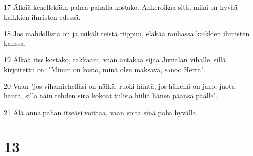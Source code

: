 \par 17 Älkää kenellekään pahaa pahalla kostako. Ahkeroikaa sitä, mikä on hyvää kaikkien ihmisten edessä.
\par 18 Jos mahdollista on ja mikäli teistä riippuu, eläkää rauhassa kaikkien ihmisten kanssa.
\par 19 Älkää itse kostako, rakkaani, vaan antakaa sijaa Jumalan vihalle, sillä kirjoitettu on: "Minun on kosto, minä olen maksava, sanoo Herra".
\par 20 Vaan "jos vihamiehelläsi on nälkä, ruoki häntä, jos hänellä on jano, juota häntä, sillä näin tehden sinä kokoat tulisia hiiliä hänen päänsä päälle".
\par 21 Älä anna pahan itseäsi voittaa, vaan voita sinä paha hyvällä.

\chapter{13}

